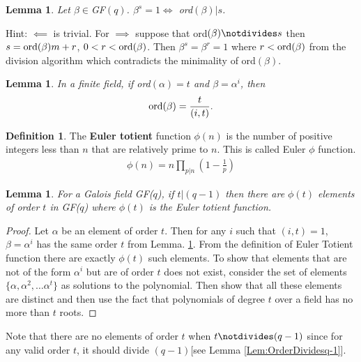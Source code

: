 \documentclass[12pt]{article}
\newtheorem{lem}[thm]{Lemma}
\theoremstyle{definition}
\newtheorem{defn}[thm]{Definition}
\begin{document}
\begin{lem}
Let $\beta\in$GF$(q)$. $\beta^s=1\iff$ ord$(\beta)|s$.
\end{lem}
Hint: $\impliedby$ is trivial. For $\implies$ suppose that ord$(\beta)\notdivides s$ then $s=\text{ord}(\beta)m+r$, $0< r<\text{ord}(\beta)$. Then $\beta^s=\beta^r=1$ where $r<\text{ord}(\beta)$ from the division algorithm which contradicts the minimality of ord$(\beta)$.


\begin{lem}
\label{Lem:OrderRelation}
In a finite field, if ord$(\alpha)=t$ and $\beta=\alpha^i$, then 
\begin{align*}
\text{ord}(\beta)=\frac{t}{(i,t)}.
\end{align*}
\end{lem}

\begin{defn}
The \textbf{Euler totient} function $\phi(n)$ is the number of positive integers less than $n$ that are relatively prime to $n$. This is called Euler $\phi$ function.
\begin{align*}
\phi(n)=n\prod_{p|n} (1-\frac{1}{p})
\end{align*}
\end{defn}


\begin{lem}
For a Galois field GF($q$), if $t|(q-1)$ then there are $\phi(t)$ elements of order $t$ in GF($q$) where $\phi(t)$ is the Euler totient function. 
\end{lem}
\begin{proof}
Let $\alpha$ be an element of order $t$. Then for any $i$ such that $(i,t)=1$, $\beta=\alpha^{i}$ has the same order $t$ from Lemma. \ref{Lem:OrderRelation}. From the definition of Euler Totient function there are exactly $\phi(t)$ such elements. To show that elements that are not of the form $\alpha^i$ but are of order $t$ does not exist, consider the set of elements $\{\alpha,\alpha^2,\ldots \alpha^t\}$ as solutions to the polynomial.  Then show that all these elements are distinct and then use the fact that polynomials of degree $t$ over a field has no more than $t$ roots.
\end{proof}
Note that there are no elements of order $t$ when $t\notdivides (q-1)$ since for any valid order $t$, it should divide $(q-1)$[see Lemma \ref{Lem:OrderDividesq-1}].
\end{document}
